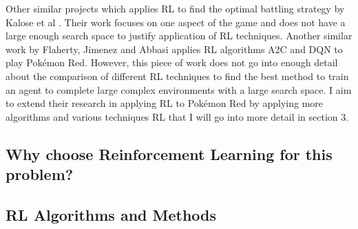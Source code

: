 Other similar projects which applies RL to find the optimal battling strategy by Kalose et al \cite{kalose2018optimal}. 
Their work focuses on one aspect of the game and does not have a large enough search space to justify application of RL techniques. 
Another similar work by Flaherty, Jimenez and Abbasi \cite{flaherty2021playing} applies RL algorithms A2C and DQN to play Pokémon 
Red. However, this piece of work does not go into enough detail about the comparison of different RL techniques to find the best
 method to train an agent to complete large complex environments with a large search space. I aim to extend their research in 
 applying RL to Pokémon Red by applying more algorithms and various techniques RL that I will go into more detail in section 3.

\subsection*{Why choose Reinforcement Learning for this problem?}

\subsection{RL Algorithms and Methods}